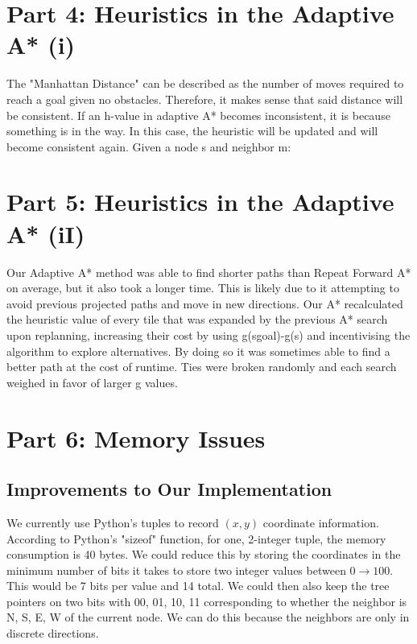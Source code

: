 \documentclass[a4paper,12pt]{article}
\begin{document}
\section{Part 4: Heuristics in the Adaptive A* (i)}
The "Manhattan Distance" can be described as the number of moves required to reach a goal given no obstacles. Therefore, it makes sense that said distance will be consistent. If an h-value in adaptive A* becomes inconsistent, it is because something is in the way. In this case, the heuristic will be updated and will become consistent again. \newline
Given a node s and neighbor m: \newline

\section{Part 5:  Heuristics in the Adaptive A* (iI)}
Our Adaptive A* method was able to find shorter paths than Repeat Forward A* on average, but it also took a longer time. This is likely due to it attempting to avoid previous projected paths and move in new directions. Our A* recalculated the heuristic value of every tile that was expanded by the previous A* search upon replanning, increasing their cost by using g(sgoal)-g(s) and incentivising the algorithm to explore alternatives.  By doing so it was sometimes able to find a better path at the cost of runtime. Ties were broken randomly and each search weighed in favor of larger g values.

\section{Part 6: Memory Issues}

\subsection{Improvements to Our Implementation}
We currently use Python's tuples to record $(x , y)$ coordinate information. According to Python's "sizeof" function, for one, 2-integer tuple, the memory consumption is 40 bytes. We could reduce this by storing the coordinates in the minimum number of bits it takes to store two integer values between $0 \rightarrow 100$. This would be 7 bits per value and 14 total. We could then also keep the tree pointers on two bits with 00, 01, 10, 11 corresponding to whether the neighbor is N, S, E, W of the current node. We can do this because the neighbors are only in discrete directions. 
\end{document}
